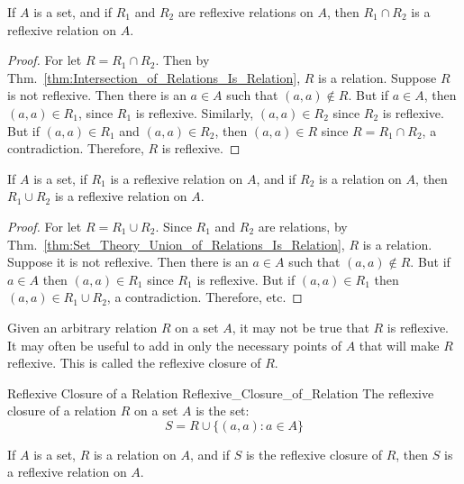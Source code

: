     \begin{theorem}
        If $A$ is a set, and if $R_{1}$ and $R_{2}$ are reflexive
        relations on $A$, then $R_{1}\cap{R}_{2}$ is a reflexive
        relation on $A$.
    \end{theorem}
    \begin{proof}
        For let $R=R_{1}\cap{R}_{2}$. Then by
        Thm.~\ref{thm:Intersection_of_Relations_Is_Relation}, $R$ is a relation.
        Suppose $R$ is not reflexive.
        Then there is an $a\in{A}$ such that $(a,a)\notin{R}$. But
        if $a\in{A}$, then $(a,a)\in{R}_{1}$, since $R_{1}$ is
        reflexive. Similarly, $(a,a)\in{R}_{2}$ since $R_{2}$ is
        reflexive. But if $(a,a)\in{R}_{1}$ and $(a,a)\in{R}_{2}$,
        then $(a,a)\in{R}$ since $R=R_{1}\cap{R}_{2}$, a
        contradiction. Therefore, $R$ is reflexive.
    \end{proof}
    \begin{theorem}
        If $A$ is a set, if $R_{1}$ is a reflexive relation on
        $A$, and if $R_{2}$ is a relation on $A$, then
        $R_{1}\cup{R}_{2}$ is a reflexive relation on $A$.
    \end{theorem}
    \begin{proof}
        For let $R=R_{1}\cup{R}_{2}$. Since $R_{1}$ and $R_{2}$ are
        relations, by
        Thm.~\ref{thm:Set_Theory_Union_of_Relations_Is_Relation},
        $R$ is a relation. Suppose it is not reflexive.
        Then there is an $a\in{A}$ such that
        $(a,a)\notin{R}$. But if $a\in{A}$ then $(a,a)\in{R}_{1}$
        since $R_{1}$ is reflexive. But if $(a,a)\in{R}_{1}$ then
        $(a,a)\in{R}_{1}\cup{R}_{2}$, a contradiction.
        Therefore, etc.
    \end{proof}
    Given an arbitrary relation $R$ on a set $A$, it may not be
    true that $R$ is reflexive. It may often be useful to add in
    only the necessary points of $A$ that will make $R$
    reflexive. This is called the reflexive closure of $R$.
    \begin{fdefinition}{Reflexive Closure of a Relation}
                       {Reflexive_Closure_of_Relation}
        The reflexive closure of a relation $R$ on a set $A$
        is the set:
        \begin{equation}
            S=R\cup\{(a,a):a\in{A}\}
        \end{equation}
    \end{fdefinition}
    \begin{theorem}
        If $A$ is a set, $R$ is a relation on $A$, and if $S$ is the
        reflexive closure of $R$, then $S$ is a reflexive relation on $A$.
    \end{theorem}
